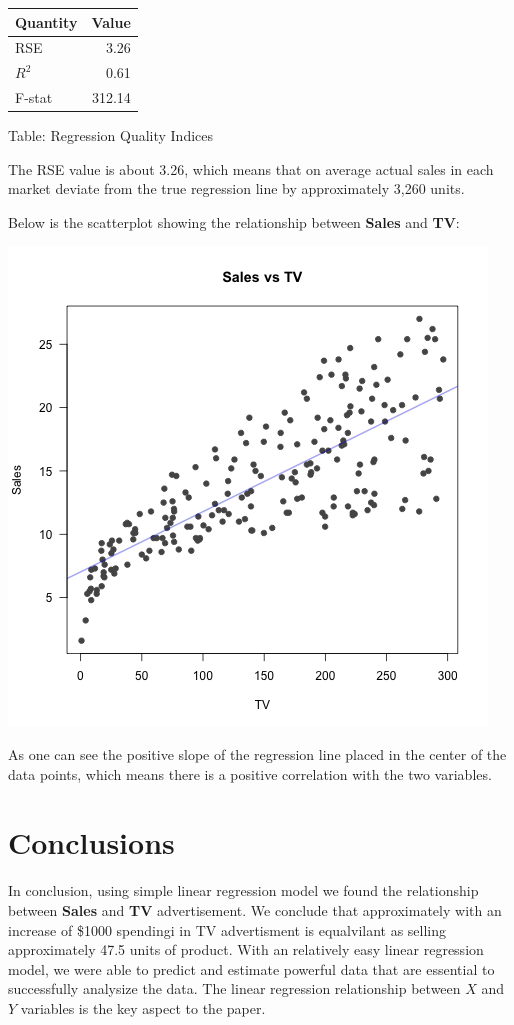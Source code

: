 \documentclass{article}
\begin{document}
\begin{tabular}{|l|r|} \hline
\bf Quantity  & Value  \\\hline
    RSE       & 3.26   \\
    $R^2$     & 0.61   \\
    F-stat    & 312.14 \\\hline
\end{tabular}

Table: Regression Quality Indices

The RSE value is about 3.26, which means that on average actual sales in each market deviate from the true regression line by approximately 3,260 units. 

Below is the scatterplot showing the relationship between \textbf{Sales} and \textbf{TV}:

\includegraphics{images/scatterplot}

As one can see the positive slope of the regression line placed in the center of the data points, which means there is a positive correlation with the two variables.  

\section{Conclusions}

In conclusion, using simple linear regression model we found the relationship between \textbf{Sales} and \textbf{TV} advertisement. We conclude that approximately with an increase of \$1000 spendingi in TV advertisment is equalvilant as selling approximately 47.5 units of product. With an relatively easy linear regression model, we were able to predict and estimate powerful data that are essential to successfully analysize the data. The linear regression relationship between $X$ and $Y$ variables is the key aspect to the paper. 
\end{document}
